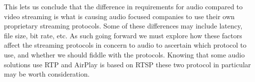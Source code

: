 This lets us conclude that the difference in requirements for audio compared to video streaming is what is causing audio focused companies to use their own proprietary streaming protocols.
Some of these differences may include latency, file size, bit rate, etc.
As such going forward we must explore how these factors affect the streaming protocols in concern to audio to ascertain which protocol to use, and whether we should fiddle with the protocols.
Knowing that some audio solutions use \ac{RTP} and AirPlay is based on \ac{RTSP} these two protocol in particular may be worth consideration.











